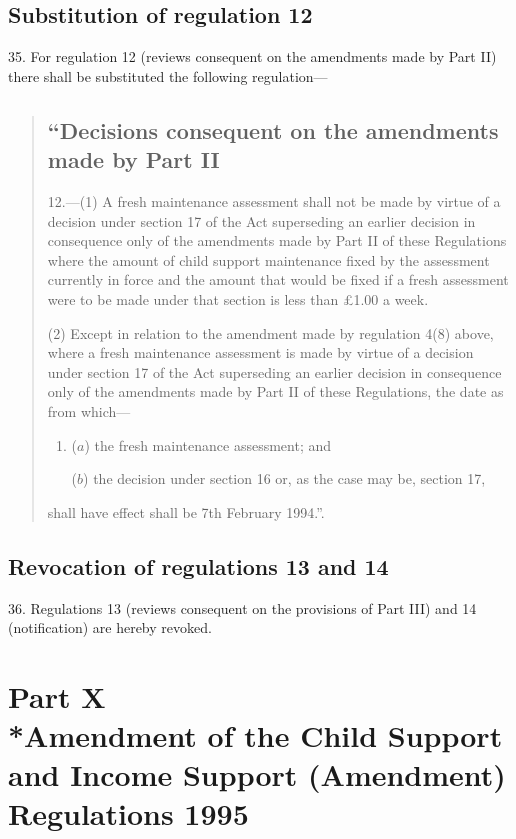 \documentclass[12pt,a4paper]{article}
\begin{document}
\subsection[35. Substitution of regulation 12]{Substitution of regulation 12}

35.  For regulation 12 (reviews consequent on the amendments made by Part II) there shall be substituted the following regulation—
\begin{quotation}
\subsection*{“Decisions consequent on the amendments made by Part II}

12.—(1) A fresh maintenance assessment shall not be made by virtue of a decision under section 17 of the Act superseding an earlier decision in consequence only of the amendments made by Part II of these Regulations where the amount of child support maintenance fixed by the assessment currently in force and the amount that would be fixed if a fresh assessment were to be made under that section is less than £1.00 a week.

(2) Except in relation to the amendment made by regulation 4(8) above, where a fresh maintenance assessment is made by virtue of a decision under section 17 of the Act superseding an earlier decision in consequence only of the amendments made by Part II of these Regulations, the date as from which—
\begin{enumerate}\item[]
($a$) the fresh maintenance assessment; and

($b$) the decision under section 16 or, as the case may be, section 17,
\end{enumerate}
shall have effect shall be 7th February 1994.”.
\end{quotation}

\subsection[36. Revocation of regulations 13 and 14]{Revocation of regulations 13 and 14}

36.  Regulations 13 (reviews consequent on the provisions of Part III) and 14 (notification) are hereby revoked.

\section[Part X --- Amendment of the Child Support and Income Support (Amendment) Regulations 1995]{Part X\\*Amendment of the Child Support and Income Support (Amendment) Regulations 1995}
\end{document}
